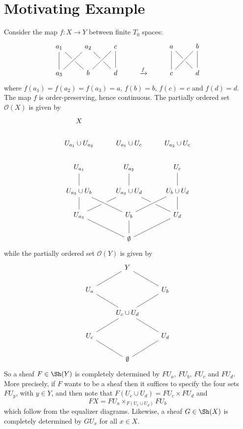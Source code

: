 %
%

\chapter{Motivating Example}

Consider the map $f : X \to Y$ between finite $T_0$ spaces:
\[ \begin{tikzcd}
a_1 \arrow[d, no head] \arrow[dr, no head] & a_2 \arrow[dl, no head, crossing over] \arrow[dr, no head] & c \arrow[d, no head] \arrow[dl, no head, crossing over] &  & a \arrow[d, no head] \arrow[dr, no head] & b \arrow[d, no head] \arrow[dl, no head, crossing over] \\
a_3 &  b  & d & \xrightarrow{f} & c & d
\end{tikzcd} \]
where $f(a_1) = f(a_2) = f(a_3) = a$, $f(b) = b$, $f(c) = c$ and $f(d) = d$. The map $f$ is order-preserving, hence continuous. The partially ordered set $\mathcal{O}(X)$ is given by
\[ \begin{tikzcd}
X \\
U_{a_1} \cup U_{a_2} & U_{a_1} \cup U_c & U_{a_2} \cup U_c \\
U_{a_1} \arrow[d, no head] & U_{a_2} \arrow[d, no head] & U_{c} \arrow[d, no head] \\
U_{a_3} \cup U_b \arrow[d, no head] & U_{a_3} \cup U_d \arrow[dr, no head] & U_b \cup U_d \\ 
U_{a_3} \arrow[dr, no head] \arrow[ur, no head] & U_b \arrow[d, no head] \arrow[ul, no head, crossing over] \arrow[ur, no head, crossing over] & U_d \arrow[dl, no head] \arrow[u, no head] \\
& \emptyset &
\end{tikzcd} \]
while the partially ordered set $\mathcal{O}(Y)$ is given by
\[ \begin{tikzcd}
& Y \arrow[dl, no head] \arrow[dr, no head] & \\
U_a \arrow[dr, no head] & & U_b \arrow[dl, no head] \\
& U_c \cup U_d \arrow[dl, no head] \arrow[dr, no head] & \\
U_c \arrow[dr, no head] & & U_d \arrow[dl, no head] \\
& \emptyset &
\end{tikzcd} \]
So a sheaf $F \in \Sh(Y)$ is completely determined by $FU_a$, $FU_b$, $FU_c$ and $FU_d$. More precisely, if $F$ wants to be a sheaf then it suffices to specify the four sets $FU_y$, with $y \in Y$, and then note that $F(U_c \cup U_d) = FU_c \times FU_d$ and
\[ FX = FU_a \times_{F(U_c \cup U_d)} FU_b \]
which follow from the equalizer diagrams. Likewise, a sheaf $G \in \Sh(X)$ is completely determined by $GU_x$ for all $x \in X$.

